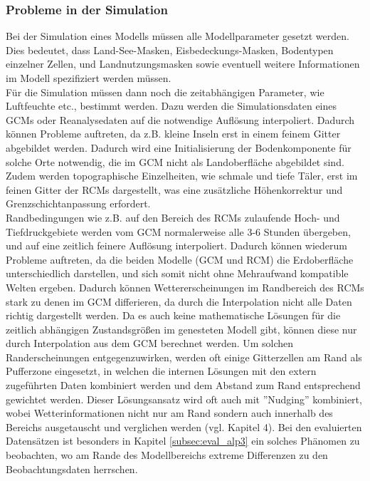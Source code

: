 \subsubsection{Probleme in der Simulation} \label{sec:problems_in_simulation}
Bei der Simulation eines Modells müssen alle Modellparameter gesetzt werden. Dies bedeutet, dass Land-See-Masken, Eisbedeckungs-Masken, Bodentypen einzelner Zellen, und Landnutzungsmasken sowie eventuell weitere Informationen im Modell spezifiziert werden müssen.\\
Für die Simulation müssen dann noch die zeitabhängigen Parameter, wie Luftfeuchte etc., bestimmt werden. Dazu werden die Simulationsdaten eines GCMs oder Reanalysedaten auf die notwendige Auflösung interpoliert. Dadurch können Probleme auftreten, da z.B. kleine Inseln erst in einem feinem Gitter abgebildet  werden. Dadurch wird eine Initialisierung der Bodenkomponente für solche Orte notwendig, die im GCM nicht als Landoberfläche abgebildet sind. Zudem werden topographische Einzelheiten, wie schmale und tiefe Täler, erst im feinen Gitter der RCMs dargestellt, was eine zusätzliche Höhenkorrektur und Grenzschichtanpassung erfordert.\\
Randbedingungen wie z.B. auf den Bereich des RCMs zulaufende Hoch- und Tiefdruckgebiete werden vom GCM normalerweise alle 3-6 Stunden übergeben, und auf eine zeitlich feinere Auflösung interpoliert. Dadurch können wiederum Probleme auftreten, da die beiden Modelle (GCM und RCM) die Erdoberfläche unterschiedlich darstellen, und sich somit nicht ohne Mehraufwand kompatible Welten ergeben. Dadurch können Wettererscheinungen im Randbereich des RCMs stark zu denen im GCM differieren, da durch die Interpolation nicht alle Daten richtig dargestellt werden. Da es auch keine mathematische Lösungen für die zeitlich abhängigen Zustandsgrößen im genesteten Modell gibt, können diese nur durch Interpolation aus dem GCM berechnet werden. Um solchen Randerscheinungen entgegenzuwirken, werden oft einige Gitterzellen am Rand als Pufferzone eingesetzt, in welchen die internen Lösungen mit den extern zugeführten Daten kombiniert werden und dem Abstand zum Rand entsprechend gewichtet werden. Dieser Lösungsansatz wird oft auch mit ''Nudging'' kombiniert, wobei Wetterinformationen nicht nur am Rand sondern auch innerhalb des Bereichs ausgetauscht und verglichen werden (vgl. \cite{RCM} Kapitel 4). Bei den evaluierten Datensätzen ist besonders in Kapitel \ref{subsec:eval_alp3} ein solches Phänomen zu beobachten, wo am Rande des Modellbereichs extreme Differenzen zu den Beobachtungsdaten herrschen.
